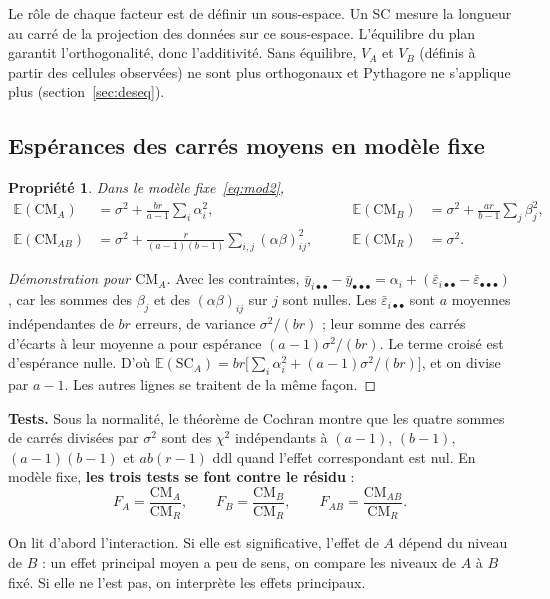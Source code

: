 \documentclass[11pt,a4paper]{article}
\theoremstyle{sj}
\newtheorem{prop}[thm]{Propriété}
\theoremstyle{definition}
\theoremstyle{remark}
\newcommand{\E}{\mathbb{E}}
\newcommand{\SC}{\mathrm{SC}}
\newcommand{\CM}{\mathrm{CM}}
\newcommand{\ybar}{\bar y}
\newcommand{\dotp}{{\scriptscriptstyle\bullet}}
\providecommand{\og}{\guillemotleft\nobreakspace}
\providecommand{\fg}{\nobreakspace\guillemotright}
\begin{document}
\begin{essentiel}
Le rôle de chaque facteur est de définir un sous-espace. Un SC mesure la longueur au carré de la projection des données sur ce sous-espace. L'équilibre du plan garantit l'orthogonalité, donc l'additivité. Sans équilibre, $V_A$ et $V_B$ (définis à partir des cellules observées) ne sont plus orthogonaux et Pythagore ne s'applique plus (section~\ref{sec:deseq}).
\end{essentiel}

\subsection{Espérances des carrés moyens en modèle fixe}

\begin{prop}\label{prop:EMSfixe}
Dans le modèle fixe~\eqref{eq:mod2},
\[
\begin{aligned}
\E(\CM_A)&=\sigma^2+\frac{br}{a-1}\sum_i\alpha_i^2, &\qquad
\E(\CM_B)&=\sigma^2+\frac{ar}{b-1}\sum_j\beta_j^2,\\
\E(\CM_{AB})&=\sigma^2+\frac{r}{(a-1)(b-1)}\sum_{i,j}(\alpha\beta)_{ij}^2, &\qquad
\E(\CM_R)&=\sigma^2.
\end{aligned}
\]
\end{prop}

\begin{proof}[Démonstration pour $\CM_A$]
Avec les contraintes, $\ybar_{i\dotp\dotp}-\ybar_{\dotp\dotp\dotp}=\alpha_i+(\bar\varepsilon_{i\dotp\dotp}-\bar\varepsilon_{\dotp\dotp\dotp})$, car les sommes des $\beta_j$ et des $(\alpha\beta)_{ij}$ sur $j$ sont nulles. Les $\bar\varepsilon_{i\dotp\dotp}$ sont $a$ moyennes indépendantes de $br$ erreurs, de variance $\sigma^2/(br)$ ; leur somme des carrés d'écarts à leur moyenne a pour espérance $(a-1)\sigma^2/(br)$. Le terme croisé est d'espérance nulle. D'où $\E(\SC_A)=br\big[\sum_i\alpha_i^2+(a-1)\sigma^2/(br)\big]$, et on divise par $a-1$. Les autres lignes se traitent de la même façon.
\end{proof}

\textbf{Tests.} Sous la normalité, le théorème de Cochran montre que les quatre sommes de carrés divisées par $\sigma^2$ sont des $\chi^2$ indépendants à $(a-1)$, $(b-1)$, $(a-1)(b-1)$ et $ab(r-1)$ ddl quand l'effet correspondant est nul. En modèle fixe, \textbf{les trois tests se font contre le résidu} :
\[
F_A=\frac{\CM_A}{\CM_R},\qquad F_B=\frac{\CM_B}{\CM_R},\qquad F_{AB}=\frac{\CM_{AB}}{\CM_R}.
\]

\begin{essentiel}
On lit d'abord l'interaction. Si elle est significative, l'effet de $A$ dépend du niveau de $B$ : un effet principal \og moyen\fg{} a peu de sens, on compare les niveaux de $A$ à $B$ fixé. Si elle ne l'est pas, on interprète les effets principaux.
\end{essentiel}
\end{document}
